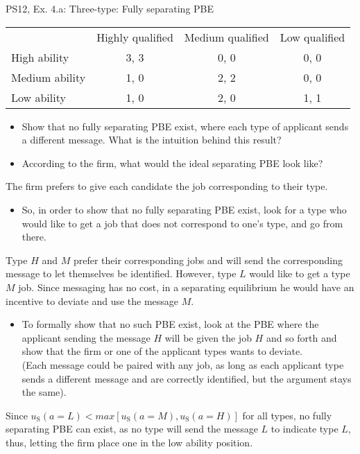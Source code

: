 \begin{frame}{PS12, Ex. 4.a: Three-type: Fully separating PBE}
    \begin{table}
      \begin{tabular}{l|c|c|c|}
          \multicolumn{1}{c}{} & \multicolumn{1}{c}{Highly qualified} & \multicolumn{1}{c}{Medium qualified} & \multicolumn{1}{c}{Low qualified} \\\cline{2-4}
          High ability   & 3, 3 & 0, 0 & 0, 0 \\\cline{2-4}
          Medium ability & 1, 0 & 2, 2 & 0, 0 \\\cline{2-4}
          Low ability    & 1, 0 & 2, 0 & 1, 1 \\\cline{2-4}
      \end{tabular}
    \end{table}\vspace{-8pt}
    \begin{itemize}
      \item[(a)] Show that no fully separating PBE exist, where each type of applicant sends a different message. What is the intuition behind this result?
      \item[Step 1:] According to the firm, what would the ideal separating PBE look like?
    \end{itemize}\vspace{-6pt}
    The firm prefers to give each candidate the job corresponding to their type.\vspace{-4pt}
    \begin{itemize}
      \item[Step 2:] So, in order to show that no fully separating PBE exist, look for a type who would like to get a job that does not correspond to one's type, and go from there.
    \end{itemize}\vspace{-6pt}
    Type $H$ and $M$ prefer their corresponding jobs and will send the corresponding message to let themselves be identified. However, type $L$ would like to get a type $M$ job. Since messaging has no cost, in a separating equilibrium he would have an incentive to deviate and use the message $M$.\vspace{-4pt}
    \begin{itemize}
      \item[Step 3:] To formally show that no such PBE exist, look at the PBE where the applicant sending the message $H$ will be given the job $H$ and so forth and show that the firm or one of the applicant types wants to deviate.\\
      (Each message could be paired with any job, as long as each applicant type sends a different message and are correctly identified, but the argument stays the same).
    \end{itemize}\vspace{-6pt}
    Since $u_\text{S}(a=L)<max[u_\text{S}(a=M),u_\text{S}(a=H)]$ for all types, no fully separating PBE can exist, as no type will send the message $L$ to indicate type $L$, thus, letting the firm place one in the low ability position.
    \vfill\null
\end{frame}


